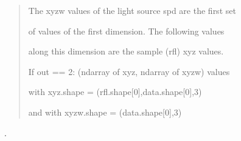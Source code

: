 \documentclass[letterpaper,10pt,english]{sphinxmanual}
\begin{document}
\begin{fulllineitems}
\begin{description}
\begin{quote}
\begin{description}
\begin{DUlineblock}{0em}
\begin{DUlineblock}{\DUlineblockindent}
\begin{DUlineblock}{\DUlineblockindent}
\begin{DUlineblock}{\DUlineblockindent}
\item[]
\begin{DUlineblock}{\DUlineblockindent}
\item[] The xyzw values of the light source spd are the first set 
\item[] of values of the first dimension. The following values 
\end{DUlineblock}
\item[] along this dimension are the sample (rfl) xyz values.
\end{DUlineblock}
\item[] If out == 2: (ndarray of xyz, ndarray of xyzw) values
\item[]
\begin{DUlineblock}{\DUlineblockindent}
\item[] with xyz.shape = (rfl.shape{[}0{]},data.shape{[}0{]},3)
\item[] and with xyzw.shape = (data.shape{[}0{]},3)
\end{DUlineblock}
\end{DUlineblock}
\end{DUlineblock}
\end{DUlineblock}

\end{description}\end{quote}

\item[{References:}] . 

\end{description}

\end{fulllineitems}

\end{document}
